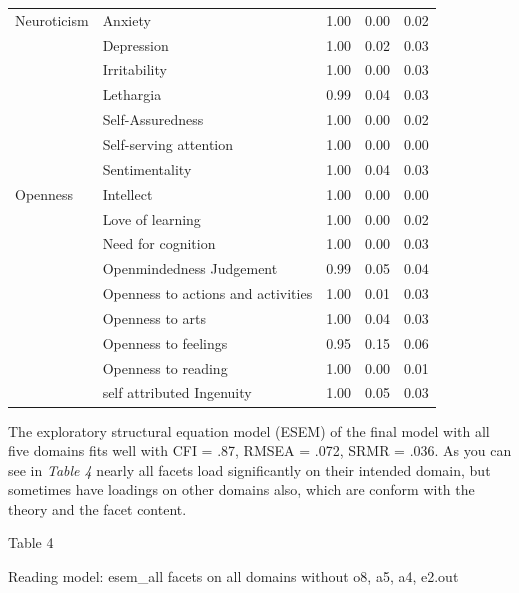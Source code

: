 \documentclass[,man,floatsintext]{apa6}
\theoremstyle{definition}
\theoremstyle{definition}
\theoremstyle{definition}
\theoremstyle{remark}
\begin{document}
\begin{table}[ht]
\begin{tabular}{llrrr}
  Neuroticism & Anxiety & 1.00 & 0.00 & 0.02 \\ 
   & Depression & 1.00 & 0.02 & 0.03 \\ 
   & Irritability & 1.00 & 0.00 & 0.03 \\ 
   & Lethargia & 0.99 & 0.04 & 0.03 \\ 
   & Self-Assuredness & 1.00 & 0.00 & 0.02 \\ 
   & Self-serving attention & 1.00 & 0.00 & 0.00 \\ 
   & Sentimentality & 1.00 & 0.04 & 0.03 \\ 
  Openness & Intellect & 1.00 & 0.00 & 0.00 \\ 
   & Love of learning & 1.00 & 0.00 & 0.02 \\ 
   & Need for cognition & 1.00 & 0.00 & 0.03 \\ 
   & Openmindedness Judgement & 0.99 & 0.05 & 0.04 \\ 
   & Openness to actions and activities & 1.00 & 0.01 & 0.03 \\ 
   & Openness to arts & 1.00 & 0.04 & 0.03 \\ 
   & Openness to feelings & 0.95 & 0.15 & 0.06 \\ 
   & Openness to reading & 1.00 & 0.00 & 0.01 \\ 
   & self attributed Ingenuity & 1.00 & 0.05 & 0.03 \\ 
   \hline
\end{tabular}
\endgroup
\end{table}

The exploratory structural equation model (ESEM) of the final model with
all five domains fits well with CFI = .87, RMSEA = .072, SRMR = .036. As
you can see in \emph{Table 4} nearly all facets load significantly on
their intended domain, but sometimes have loadings on other domains
also, which are conform with the theory and the facet content.

Table 4

Reading model: esem\_all facets on all domains without o8, a5, a4,
e2.out
\end{document}
